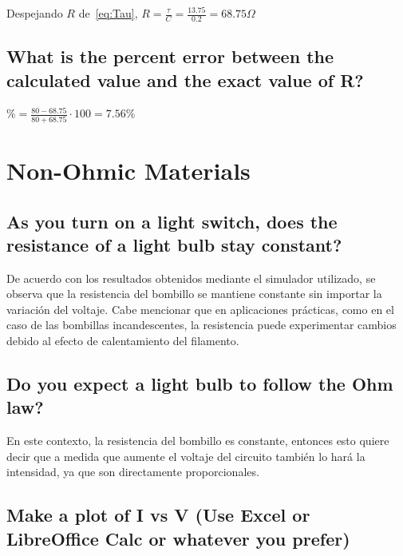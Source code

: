 \documentclass[twocolumn, 12pt]{article}
\begin{document}
Despejando $R$ de~\eqref{eq:Tau}, $R = \frac{\tau}{C} =
    \frac{13.75}{0.2} = 68.75 \Omega$

\subsection{What is the percent error between the calculated value and the exact value of R?}

$\% = \frac{80 - 68.75}{80 + 68.75} \cdot 100 = 7.56\%$

\section{Non-Ohmic Materials}

\subsection{As you turn on a light switch, does the resistance of a light bulb stay constant?}

De acuerdo con los resultados obtenidos mediante el
simulador utilizado, se observa que la resistencia del
bombillo se mantiene constante sin importar la variación
del voltaje. Cabe mencionar que en aplicaciones prácticas,
como en el caso de las bombillas incandescentes, la
resistencia puede experimentar cambios debido al efecto de
calentamiento del filamento.

\subsection{Do you expect a light bulb to follow the Ohm law?}

\nocite{prezi.com}

En este contexto, la resistencia del bombillo es constante,
entonces esto quiere decir que a medida que aumente el
voltaje del circuito también lo hará la intensidad, ya que
son directamente proporcionales.

\subsection*{Make a plot of I vs V (Use Excel or LibreOffice Calc or whatever you prefer)}
\end{document}
